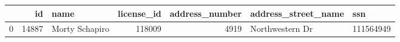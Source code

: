 \begin{tabular}{lrlrrll}
\toprule
 & id & name & license_id & address_number & address_street_name & ssn \\
\midrule
0 & 14887 & Morty Schapiro & 118009 & 4919 & Northwestern Dr & 111564949 \\
\bottomrule
\end{tabular}
